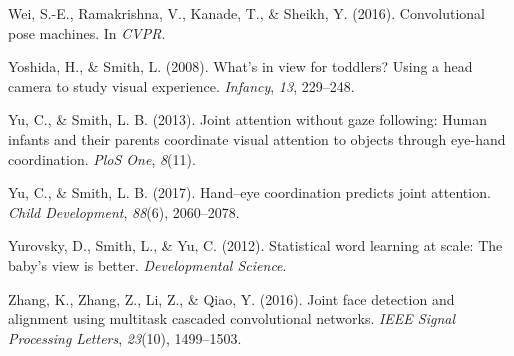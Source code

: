 \documentclass[english,man]{apa6}
\begin{document}
\hypertarget{ref-wei2016cpm}{}
Wei, S.-E., Ramakrishna, V., Kanade, T., \& Sheikh, Y. (2016).
Convolutional pose machines. In \emph{CVPR}.

\hypertarget{ref-yoshida2008}{}
Yoshida, H., \& Smith, L. (2008). What's in view for toddlers? Using a
head camera to study visual experience. \emph{Infancy}, \emph{13},
229--248.

\hypertarget{ref-yu2013joint}{}
Yu, C., \& Smith, L. B. (2013). Joint attention without gaze following:
Human infants and their parents coordinate visual attention to objects
through eye-hand coordination. \emph{PloS One}, \emph{8}(11).

\hypertarget{ref-yu2017hand}{}
Yu, C., \& Smith, L. B. (2017). Hand--eye coordination predicts joint
attention. \emph{Child Development}, \emph{88}(6), 2060--2078.

\hypertarget{ref-yurovsky2012}{}
Yurovsky, D., Smith, L., \& Yu, C. (2012). Statistical word learning at
scale: The baby's view is better. \emph{Developmental Science}.

\hypertarget{ref-zhang2016}{}
Zhang, K., Zhang, Z., Li, Z., \& Qiao, Y. (2016). Joint face detection
and alignment using multitask cascaded convolutional networks.
\emph{IEEE Signal Processing Letters}, \emph{23}(10), 1499--1503.

\endgroup
\end{document}
